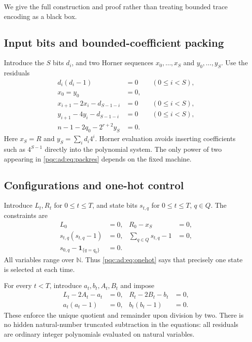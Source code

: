 \documentclass[11pt,letterpaper]{article}
\numberwithin{equation}{section}
\theoremstyle{definition}
\theoremstyle{remark}
\newcommand{\N}{\mathbb N}
\newcommand{\indic}[1]{\mathbf 1_{\{#1\}}}
\begin{document}
We give the full construction and proof rather than treating bounded
trace encoding as a black box.

\subsection{Input bits and bounded-coefficient packing}
Introduce the $S$ bits $d_i$, and two Horner sequences
$x_0,\ldots,x_S$ and $y_0,\ldots,y_S$. Use the residuals
\begin{align}
d_i(d_i-1)&=0 &&(0\le i<S),\label{pqc:ad:eq:bits}\\
x_0=y_0&=0,\nonumber\\
x_{i+1}-2x_i-d_{S-1-i}&=0 &&(0\le i<S),\label{pqc:ad:eq:hornerx}\\
y_{i+1}-4y_i-d_{S-1-i}&=0 &&(0\le i<S),\label{pqc:ad:eq:hornery}\\
n-1-2q_0-2^{r+2}y_S&=0.\label{pqc:ad:eq:packres}
\end{align}
Here $x_S=R$ and $y_S=\sum_i d_i4^i$. Horner evaluation avoids inserting
coefficients such as $4^{S-1}$ directly into the polynomial system. The
only power of two appearing in \eqref{pqc:ad:eq:packres} depends on the fixed
machine.

\subsection{Configurations and one-hot control}
Introduce $L_t,R_t$ for $0\le t\le T$, and state bits $s_{t,q}$ for
$0\le t\le T$, $q\in Q$. The constraints are
\begin{align}
L_0&=0,& R_0-x_S&=0,\label{pqc:ad:eq:initialtapes}\\
s_{t,q}(s_{t,q}-1)&=0,& \sum_{q\in Q}s_{t,q}-1&=0,\label{pqc:ad:eq:onehot}\\
s_{0,q}-\indic{q=q_0}&=0.&&\label{pqc:ad:eq:initialstate}
\end{align}
All variables range over $\N$. Thus \eqref{pqc:ad:eq:onehot} says that precisely
one state is selected at each time.

For every $t<T$, introduce $a_t,b_t,A_t,B_t$ and impose
\begin{align}
L_t-2A_t-a_t&=0,&R_t-2B_t-b_t&=0,\label{pqc:ad:eq:division}\\
a_t(a_t-1)&=0,&b_t(b_t-1)&=0.\label{pqc:ad:eq:tapebits}
\end{align}
These enforce the unique quotient and remainder upon division by two.
There is no hidden natural-number truncated subtraction in the equations:
all residuals are ordinary integer polynomials evaluated on natural
variables.
\end{document}

